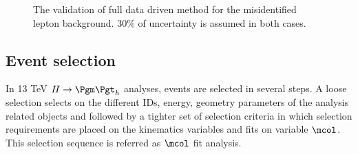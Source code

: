 \begin{figure}[htbp] 
     \centering
     \caption{The validation of full data driven method for the misidentified lepton background. 30\% of uncertainty is assumed in both cases. }
     \label{fig:fakebackgroundValidation}
\end{figure}











\subsection{Event selection}
In 13 TeV $H\rightarrow\Pgm\Pgt_h$ analyses, events are selected in several steps. A loose selection selects on the different IDs, energy, geometry parameters of the analysis related objects and followed by a tighter set of selection criteria in which selection requirements are placed on the kinematics variables and fits on variable $\mcol$. This selection sequence is referred as $\mcol$ fit analysis.


